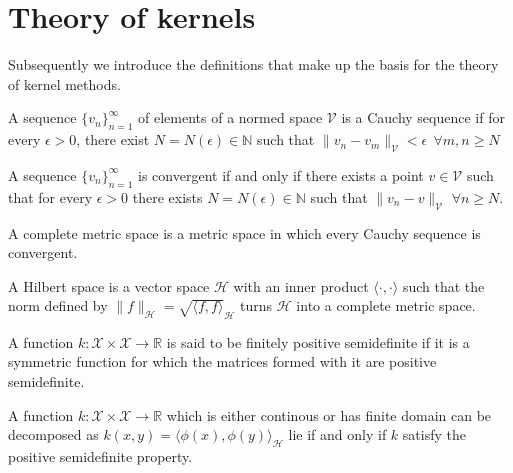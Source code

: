 \section{Theory of kernels}
Subsequently we introduce the definitions that make up the basis for the theory of kernel methods.


\begin{definition}
    A sequence $\{v_n\}_{n=1}^{\infty}$ of elements of a normed space $\mathcal{V}$ is a Cauchy sequence if for every $\epsilon>0$, there exist $N=N(\epsilon) \in \mathbb{N}$ such that $\|v_n-v_m\|_{\mathcal{V}}<\epsilon \ \ \forall m,n\geq N$  
\end{definition}

\begin{definition}
    A sequence $\{v_n\}_{n=1}^{\infty}$ is convergent if and only if there exists a point $ v \in \mathcal{V}$ such that for every $\epsilon>0$ there exists $N=N(\epsilon) \in \mathbb{N}$ such that  $\|v_n-v\|_{\mathcal{V}}$ $\forall n\geq N$.
\end{definition}

\begin{definition}
    A complete metric space is a metric space in which every Cauchy sequence is convergent.
\end{definition}


\begin{definition}
    A Hilbert space is a vector space $\mathcal{H}$ with an inner product $\langle \cdot, \cdot \rangle$ such that the norm defined by $\|f\|_{\mathcal{H}}=\sqrt{\langle f, f \rangle}_{\mathcal{H}}$
turns $\mathcal{H}$ into a complete metric space.
\end{definition}



\begin{definition}
    A function $k: \mathcal{X} \times \mathcal{X} \to \mathbb{R}$ is said to be finitely positive semidefinite if it is a symmetric function for which the matrices formed with it are positive semidefinite.
\end{definition}

\begin{theorem}    
    A function $k:\mathcal{X} \times \mathcal{X} \to \mathbb{R}$ which is either continous or has finite domain can be decomposed as $k(x,y)=\langle \phi(x), \phi(y) \rangle_{\mathcal{H}}$ lie if and only if $k$ satisfy the positive semidefinite property.
\end{theorem}

